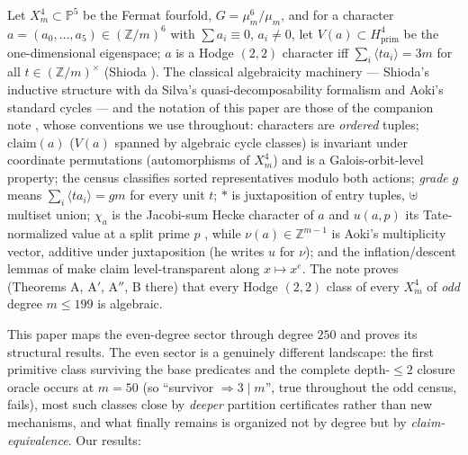\documentclass[11pt]{amsart}
\theoremstyle{remark}
\newcommand{\Z}{\mathbb{Z}}
\newcommand{\PP}{\mathbb{P}}
\newcommand{\fr}[1]{\langle #1\rangle}
\newcommand{\V}{V}
\begin{document}
Let $X^4_m\subset\PP^5$ be the Fermat fourfold, $G=\mu_m^6/\mu_m$, and for a character
$a=(a_0,\dots,a_5)\in(\Z/m)^6$ with $\sum a_i\equiv0$, $a_i\neq0$, let
$\V(a)\subset H^4_{\mathrm{prim}}$ be the one-dimensional eigenspace; $a$ is a Hodge $(2,2)$
character iff $\sum_i\fr{ta_i}=3m$ for all $t\in(\Z/m)^\times$ (Shioda \cite{Shioda79}). The
classical algebraicity machinery --- Shioda's inductive structure with da Silva's
quasi-decomposability formalism \cite{Shioda79,SK,daSilva} and Aoki's standard cycles
\cite{Aoki87} --- and the notation of this paper are those of the companion note \cite{BN}, whose
conventions we use throughout: characters are \emph{ordered} tuples; $\mathrm{claim}(a)$
($\V(a)$ spanned by algebraic cycle classes) is invariant under coordinate permutations
(automorphisms of $X^4_m$) and is a Galois-orbit-level property; the census classifies sorted
representatives modulo both actions; \emph{grade} $g$ means $\sum_i\fr{ta_i}=gm$ for every unit
$t$; $*$ is juxtaposition of entry tuples, $\uplus$ multiset union; $\chi_a$ is the Jacobi-sum
Hecke character of $a$ and $u(a,p)$ its Tate-normalized value at a split prime $p$
\cite{Weil49,Weil52}, while $\nu(a)\in\Z^{m-1}$ is Aoki's multiplicity vector, additive under
juxtaposition (he writes $u$ for $\nu$); and the inflation/descent lemmas of
\cite{BN} make claim level-transparent along $x\mapsto x^e$. The note proves (Theorems A, A$'$,
A$''$, B there) that every Hodge $(2,2)$ class of every $X^4_m$ of \emph{odd} degree $m\le199$
is algebraic.

This paper maps the even-degree sector through degree $250$ and proves its structural results.
The even sector is a genuinely different landscape: the first primitive class surviving the base
predicates and the complete depth-$\le2$ closure oracle occurs at $m=50$ (so ``survivor
$\Rightarrow3\mid m$'', true throughout the odd census, fails), most such classes close by
\emph{deeper} partition certificates rather than new mechanisms, and what finally remains is organized not by degree but by \emph{claim-equivalence}.
Our results:
\end{document}
